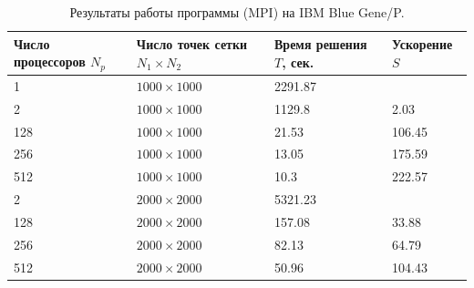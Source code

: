 \documentclass[11pt]{article}
\numberwithin{equation}{section}
\theoremstyle{plain}
\theoremstyle{definition}
\begin{document}
\begin{table}[h]
\centering
\begin{tabular}{|l|l|l|l|}\hline
Число процессоров $N_p$ & Число точек сетки $N_1 \times N_2$ & Время решения $T$, сек. & Ускорение $S$ \\ \hline
1                       & $1000 \times 1000$                 & 2291.87                 &               \\
2                       & $1000 \times 1000$                 & 1129.8                  & 2.03          \\
128                     & $1000 \times 1000$                 & 21.53                   & 106.45        \\
256                     & $1000 \times 1000$                 & 13.05                   & 175.59        \\
512                     & $1000 \times 1000$                 & 10.3                    & 222.57        \\ \hline
2                       & $2000 \times 2000$                 & 5321.23                 &               \\
128                     & $2000 \times 2000$                 & 157.08                  & 33.88         \\
256                     & $2000 \times 2000$                 & 82.13                   & 64.79         \\
512                     & $2000 \times 2000$                 & 50.96                   & 104.43        \\ \hline
\end{tabular}
    \caption{Результаты работы программы (MPI) на IBM Blue Gene/P.}
\label{tab_mpi}
\end{table}
\end{document}
